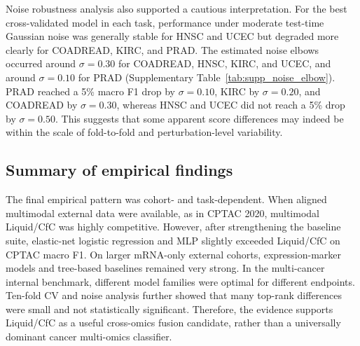 Noise robustness analysis also supported a cautious interpretation. For the best cross-validated model in each task, performance under moderate test-time Gaussian noise was generally stable for HNSC and UCEC but degraded more clearly for COADREAD, KIRC, and PRAD. The estimated noise elbows occurred around \(\sigma=0.30\) for COADREAD, HNSC, KIRC, and UCEC, and around \(\sigma=0.10\) for PRAD (Supplementary Table~\ref{tab:supp_noise_elbow}). PRAD reached a 5\% macro F1 drop by \(\sigma=0.10\), KIRC by \(\sigma=0.20\), and COADREAD by \(\sigma=0.30\), whereas HNSC and UCEC did not reach a 5\% drop by \(\sigma=0.50\). This suggests that some apparent score differences may indeed be within the scale of fold-to-fold and perturbation-level variability.

\subsection{Summary of empirical findings}

The final empirical pattern was cohort- and task-dependent. When aligned multimodal external data were available, as in CPTAC 2020, multimodal Liquid/CfC was highly competitive. However, after strengthening the baseline suite, elastic-net logistic regression and MLP slightly exceeded Liquid/CfC on CPTAC macro F1. On larger mRNA-only external cohorts, expression-marker models and tree-based baselines remained very strong. In the multi-cancer internal benchmark, different model families were optimal for different endpoints. Ten-fold CV and noise analysis further showed that many top-rank differences were small and not statistically significant. Therefore, the evidence supports Liquid/CfC as a useful cross-omics fusion candidate, rather than a universally dominant cancer multi-omics classifier.

